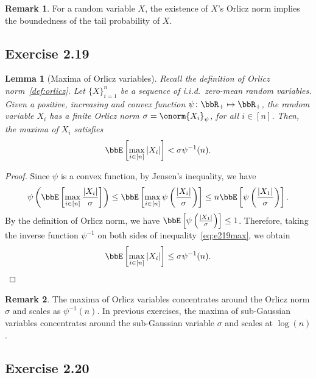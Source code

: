\documentclass[11pt]{article}
\newcommand{\of}[1]{\left(#1\right)}
\newcommand{\off}[1]{\left[#1\right]}
\theoremstyle{plain}
\newtheorem{lem}{Lemma}
\theoremstyle{definition}
\newtheorem{rmk}{Remark}
\begin{document}
    \begin{rmk}
    	For a random variable $X$, the existence of $X$'s Orlicz norm implies the boundedness of the tail probability of $X$.
    \end{rmk}
    
\subsection{Exercise 2.19}
\begin{lem}[Maxima of Orlicz variables] Recall the definition of Orlicz norm~\ref{def:orlicz}. Let $\{X\}_{i=1}^n$ be a sequence of i.i.d.\ zero-mean random variables. Given a positive, increasing and convex function $\psi \colon \bbR_+ \mapsto \bbR_+$, the random variable $X_i$ has a finite Orlicz norm $\sigma = \onorm{X_i}_{\psi}$, for all $i \in [n]$. Then, the maxima of $X_i$ satisfies
\begin{equation}
	\bbE \off{ \max_{i\in[n]} |X_i| } < \sigma \psi^{-1}(n).
\end{equation}
	
\end{lem}

\begin{proof}
	Since $\psi$ is a convex function, by Jensen's inequality, we have
	\begin{equation}\label{eq:e219max}
		\psi \of{\bbE \off{\max_{i \in [n]} \frac{|X_i|}{\sigma}  } } \leq \bbE \off{ \max_{i\in[n]} \psi \of{\frac{|X_i|}{\sigma}}   } \leq n \bbE \off{ \psi \of{\frac{|X_1|}{\sigma}} }.
	\end{equation}
	By the definition of Orlicz norm, we have $\bbE \off{ \psi \of{\frac{|X_1|}{\sigma}} } \leq 1$. Therefore, taking the inverse function $\psi^{-1}$ on both sides of inequality~\eqref{eq:e219max}, we obtain
	\[  \bbE \off{\max_{i \in [n]} {|X_i|} } \leq \sigma \psi^{-1}(n).  \]
\end{proof}

\begin{rmk}
	The maxima of Orlicz variables concentrates around the Orlicz norm $\sigma$ and scales as $\psi^{-1}(n)$. In previous exercises, the maxima of sub-Gaussian variables concentrates around the sub-Gaussian variable $\sigma$ and scales at $\log (n)$. 
\end{rmk}
    
\subsection{Exercise 2.20}
\end{document}
